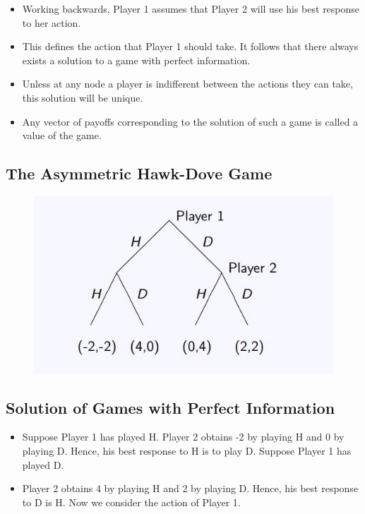 \documentclass[]{report}
\begin{document}
\begin{itemize}
	\item Working backwards, Player 1 assumes that Player 2 will use his
	best response to her action.
	\item This defines the action that Player 1 should take.
	It follows that there always exists a solution to a game with perfect
	information.
	\item  Unless at any node a player is indifferent between the
	actions they can take, this solution will be unique.
	\item 	Any vector of payoffs corresponding to the solution of such a game
	is called a value of the game.
\end{itemize}


\subsection{The Asymmetric Hawk-Dove Game}



\begin{figure}[h!]
\centering
\includegraphics[width=0.6\linewidth]{images/DR5-Slide36}
\caption{}
\label{fig:DR5-Slide36}
\end{figure}


\subsection{Solution of Games with Perfect Information}
\begin{itemize}
	\item Suppose Player 1 has played H. Player 2 obtains -2 by playing H
	and 0 by playing D. Hence, his best response to H is to play D.
	Suppose Player 1 has played D. 
	\item Player 2 obtains 4 by playing H
	and 2 by playing D. Hence, his best response to D is H.
	Now we consider the action of Player 1.
\end{itemize}
\end{document}
